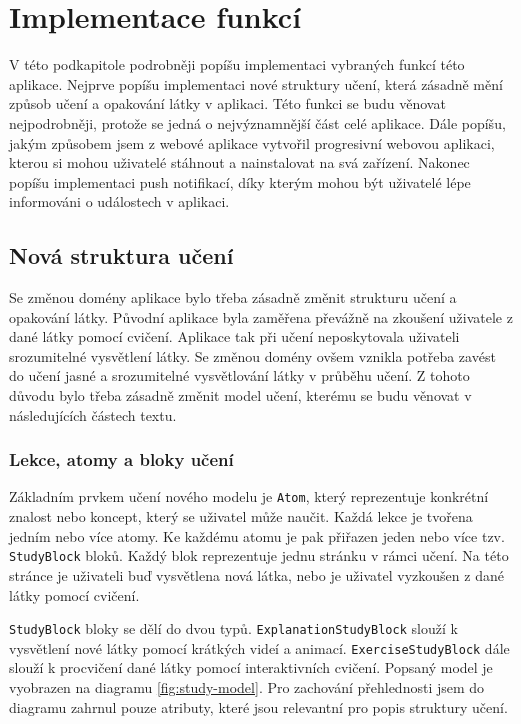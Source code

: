\section{Implementace funkcí}

V této podkapitole podrobněji popíšu implementaci vybraných funkcí této aplikace. Nejprve popíšu implementaci nové struktury učení, která zásadně mění způsob učení a opakování látky v aplikaci. Této funkci se budu věnovat nejpodrobněji, protože se jedná o nejvýznamnější část celé aplikace. Dále popíšu, jakým způsobem jsem z webové aplikace vytvořil progresivní webovou aplikaci, kterou si mohou uživatelé stáhnout a nainstalovat na svá zařízení. Nakonec popíšu implementaci push notifikací, díky kterým mohou být uživatelé lépe informováni o událostech v aplikaci.

\subsection{Nová struktura učení}

Se změnou domény aplikace bylo třeba zásadně změnit strukturu učení a opakování látky. Původní aplikace byla zaměřena převážně na zkoušení uživatele z dané látky pomocí cvičení. Aplikace tak při učení neposkytovala uživateli srozumitelné vysvětlení látky. Se změnou domény ovšem vznikla potřeba zavést do učení jasné a srozumitelné vysvětlování látky v průběhu učení. Z tohoto důvodu bylo třeba zásadně změnit model učení, kterému se budu věnovat v následujících částech textu. 

\subsubsection{Lekce, atomy a bloky učení}

Základním prvkem učení nového modelu je \texttt{Atom}, který reprezentuje konkrétní znalost nebo koncept, který se uživatel může naučit. Každá lekce je tvořena jedním nebo více atomy. Ke každému atomu je pak přiřazen jeden nebo více tzv. \texttt{StudyBlock} bloků. Každý blok reprezentuje jednu stránku v rámci učení. Na této stránce je uživateli buď vysvětlena nová látka, nebo je uživatel vyzkoušen z dané látky pomocí cvičení. 

\texttt{StudyBlock} bloky se dělí do dvou typů. \texttt{ExplanationStudyBlock} slouží k vysvětlení nové látky pomocí krátkých videí a animací. \texttt{ExerciseStudyBlock} dále slouží k procvičení dané látky pomocí interaktivních cvičení. Popsaný model je vyobrazen na diagramu \ref{fig:study-model}. Pro zachování přehlednosti jsem do diagramu zahrnul pouze atributy, které jsou relevantní pro popis struktury učení.

